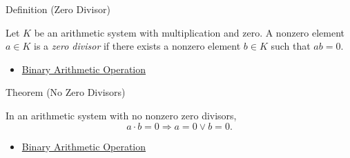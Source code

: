 \begin{definitionbox}{Definition (Zero Divisor)}
\begin{definition}
\label{def:zero-divisor}
Let $K$ be an arithmetic system with multiplication and zero. A nonzero
element $a\in K$ is a \emph{zero divisor} if there exists a nonzero element
$b\in K$ such that $ab=0$.
\end{definition}
\end{definitionbox}

\begin{dependencies}
\begin{itemize}
  \item \hyperref[def:binary-arithmetic-operation]{Binary Arithmetic Operation}
\end{itemize}
\end{dependencies}

\begin{theorembox}{Theorem (No Zero Divisors)}
\begin{theorem}
\label{thm:no-zero-divisors}
In an arithmetic system with no nonzero zero divisors,
\[
a\cdot b=0 \Longrightarrow a=0 \lor b=0.
\]
\end{theorem}
\end{theorembox}

\begin{dependencies}
\begin{itemize}
  \item \hyperref[def:binary-arithmetic-operation]{Binary Arithmetic Operation}
\end{itemize}
\end{dependencies}
